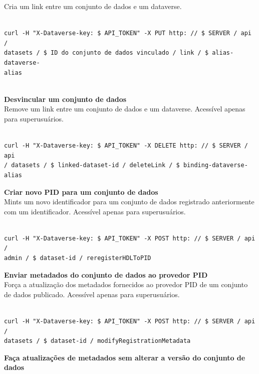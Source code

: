 \documentclass[12pt,hidelinks]{article}
\begin{document}
Cria um link entre um conjunto de dados e um dataverse.

\begin{verbatim}

curl -H "X-Dataverse-key: $ API_TOKEN" -X PUT http: // $ SERVER / api /
datasets / $ ID do conjunto de dados vinculado / link / $ alias-
dataverse-
alias
 
\end{verbatim}
 
\textbf{Desvincular um conjunto de dados}\\

Remove um link entre um conjunto de dados e um dataverse. Acessível apenas para superusuários.

\begin{verbatim}

curl -H "X-Dataverse-key: $ API_TOKEN" -X DELETE http: // $ SERVER / api 
/ datasets / $ linked-dataset-id / deleteLink / $ binding-dataverse-alias

\end{verbatim}
 
\textbf{Criar novo PID para um conjunto de dados}\\

Mints um novo identificador para um conjunto de dados registrado anteriormente com um identificador. Acessível apenas para superusuários.

\begin{verbatim}

curl -H "X-Dataverse-key: $ API_TOKEN" -X POST http: // $ SERVER / api /
admin / $ dataset-id / reregisterHDLToPID

\end{verbatim}
 
\textbf{Enviar metadados do conjunto de dados ao provedor PID}\\

Força a atualização dos metadados fornecidos ao provedor PID de um conjunto de dados publicado. Acessível apenas para superusuários.

\begin{verbatim}

curl -H "X-Dataverse-key: $ API_TOKEN" -X POST http: // $ SERVER / api /
datasets / $ dataset-id / modifyRegistrationMetadata

\end{verbatim}
 
\textbf{Faça atualizações de metadados sem alterar a versão do conjunto de dados}\\
\end{document}
